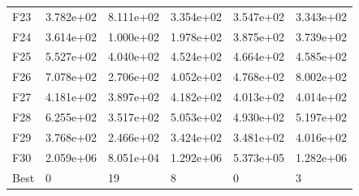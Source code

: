 \begin{tabular}{llllll}
F23  &  3.782e+02 &  8.111e+02 &  3.354e+02 &  3.547e+02 &  3.343e+02 \\
F24  &  3.614e+02 &  1.000e+02 &  1.978e+02 &  3.875e+02 &  3.739e+02 \\
F25  &  5.527e+02 &  4.040e+02 &  4.524e+02 &  4.664e+02 &  4.585e+02 \\
F26  &  7.078e+02 &  2.706e+02 &  4.052e+02 &  4.768e+02 &  8.002e+02 \\
F27  &  4.181e+02 &  3.897e+02 &  4.182e+02 &  4.013e+02 &  4.014e+02 \\
F28  &  6.255e+02 &  3.517e+02 &  5.053e+02 &  4.930e+02 &  5.197e+02 \\
F29  &  3.768e+02 &  2.466e+02 &  3.424e+02 &  3.481e+02 &  4.016e+02 \\
F30  &  2.059e+06 &  8.051e+04 &  1.292e+06 &  5.373e+05 &  1.282e+06 \\
Best &          0 &         19 &          8 &          0 &          3 \\
\bottomrule
\end{tabular}
